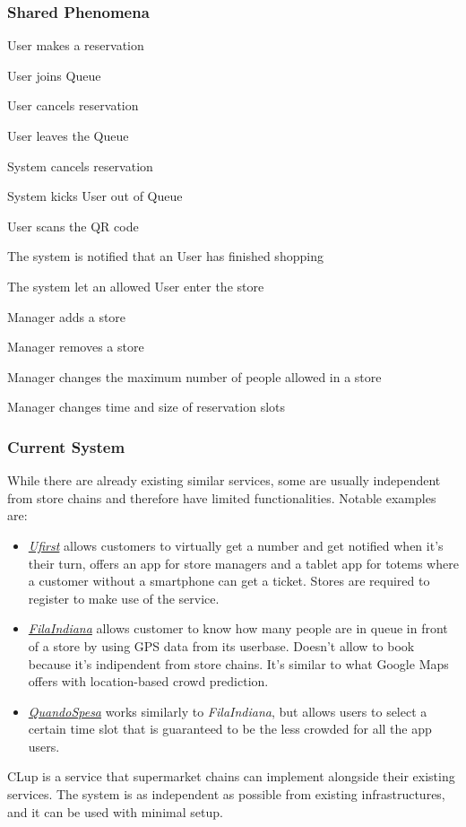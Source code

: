 \subsubsection{Shared Phenomena}
\begin{enumerate}[label={[SP\arabic*]}]
    \item User makes a reservation
    \item User joins Queue
    \item User cancels reservation
    \item User leaves the Queue
    \item System cancels reservation
    \item System kicks User out of Queue
    \item User scans the QR code
    \item The system is notified that an User has finished shopping
    \item The system let an allowed User enter the store 
    \item Manager adds a store
    \item Manager removes a store
    \item Manager changes the maximum number of people allowed in a store
    \item Manager changes time and size of reservation slots
\end{enumerate}

\subsubsection{Current System}
While there are already existing similar services, some are usually independent from store chains and
therefore have limited functionalities.
Notable examples are:
\begin{itemize}
    \item \href{https://www.ufirst.com}{\emph{Ufirst}} allows customers to virtually get a number
        and get notified when it's their turn, offers an app for store managers and a tablet app for totems
        where a customer without a smartphone can get a ticket. Stores are required to register to make use
        of the service.
    \item \href{https://play.google.com/store/apps/details?id=com.codaliscia}{\emph{FilaIndiana}} allows customer to
        know how many people are in queue in front of a store by using GPS data from its userbase. Doesn't allow to
        book because it's indipendent from store chains. It's similar to what Google Maps offers with location-based
        crowd prediction.
    \item \href{https://play.google.com/store/apps/details?id=it.anybot.quandospesa}{\emph{QuandoSpesa}} works similarly
        to \emph{FilaIndiana}, but allows users to select a certain time slot that is guaranteed to be the less crowded
        for all the app users.
    
\end{itemize} 
CLup is a service that supermarket chains can implement alongside their existing services. The system is as independent as possible from existing infrastructures, and it can be used with minimal setup.

